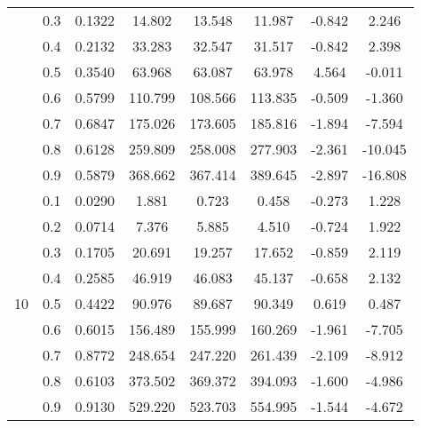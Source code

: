 \documentclass[11pt,a4paper]{report}
\begin{document}
\begin{longtable}{ | c | c || c | c | c | c | c | c | }
 & 0.3 & 0.1322 & 14.802 & 13.548 & 11.987 & -0.842 & 2.246 \\
 & 0.4 & 0.2132 & 33.283 & 32.547 & 31.517 & -0.842 & 2.398 \\
 & 0.5 & 0.3540 & 63.968 & 63.087 & 63.978 & 4.564 & -0.011 \\
 & 0.6 & 0.5799 & 110.799 & 108.566 & 113.835 & -0.509 & -1.360 \\
 & 0.7 & 0.6847 & 175.026 & 173.605 & 185.816 & -1.894 & -7.594 \\
 & 0.8 & 0.6128 & 259.809 & 258.008 & 277.903 & -2.361 & -10.045 \\
 & 0.9 & 0.5879 & 368.662 & 367.414 & 389.645 & -2.897 & -16.808 \\
 \hline
\multirow{9}{*}{10} & 0.1 & 0.0290 & 1.881 & 0.723 & 0.458 & -0.273 & 1.228 \\
 & 0.2 & 0.0714 & 7.376 & 5.885 & 4.510 & -0.724 & 1.922 \\
 & 0.3 & 0.1705 & 20.691 & 19.257 & 17.652 & -0.859 & 2.119 \\
 & 0.4 & 0.2585 & 46.919 & 46.083 & 45.137 & -0.658 & 2.132 \\
 & 0.5 & 0.4422 & 90.976 & 89.687 & 90.349 & 0.619 & 0.487 \\
 & 0.6 & 0.6015 & 156.489 & 155.999 & 160.269 & -1.961 & -7.705 \\
 & 0.7 & 0.8772 & 248.654 & 247.220 & 261.439 & -2.109 & -8.912 \\
 & 0.8 & 0.6103 & 373.502 & 369.372 & 394.093 & -1.600 & -4.986 \\
 & 0.9 & 0.9130 & 529.220 & 523.703 & 554.995 & -1.544 & -4.672 \\
 \hline
\hline
\end{longtable}
\end{document}
